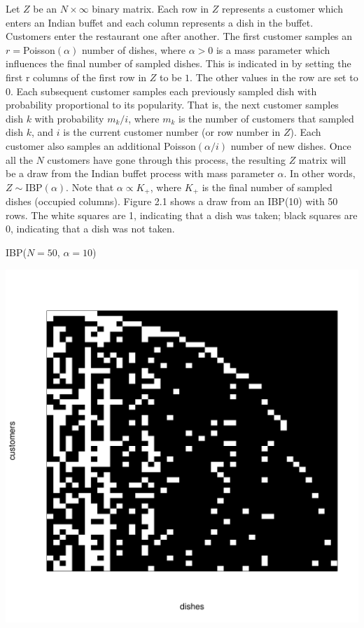 \noindent
Let $Z$ be an $N \times \infty$ binary matrix. Each row in $Z$ represents a
customer which enters an Indian buffet and each column represents a dish in the
buffet. Customers enter the restaurant one after another. The first customer
samples an $r=$Poisson$(\alpha)$ number of dishes, where $\alpha > 0$ is a mass
parameter which influences the final number of sampled dishes. This is
indicated in by setting the first r columns of the first row in $Z$ to be $1$.
The other values in the row are set to $0$. Each subsequent customer samples
each previously sampled dish with probability proportional to its popularity.
That is, the next customer samples dish $k$ with probability $m_k/i$,
where $m_k$ is the number of customers that sampled dish $k$, and $i$ is the
current customer number (or row number in $Z$). Each customer also samples an
additional Poisson$(\alpha/i)$ number of new dishes. Once all the $N$ customers
have gone through this process, the resulting $Z$ matrix will be a draw from
the Indian buffet process with mass parameter $\alpha$. In other words, $Z \sim
\text{IBP}(\alpha)$. Note that $\alpha \propto K_+$, where $K_+$ is the final
number of sampled dishes (occupied columns). Figure 2.1 shows a draw from an
IBP(10) with 50 rows. The white squares are 1, indicating that a dish was
taken; black squares are 0, indicating that a dish was not taken. \\
\beginmyfig
  \caption{IBP($N=50$, $\alpha=10$)}
  \includegraphics{images/ibp.pdf}
\endmyfig

